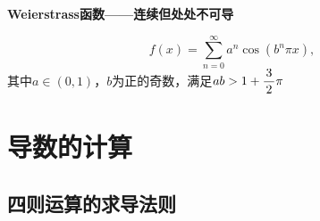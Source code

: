 \begin{shaded}
	{\bf Weierstrass函数——连续但处处不可导}
	
	$$f(x)=\sum\limits_{n=0}^{\infty}a^n\cos(b^n\pi x),$$
	其中$a\in(0,1)$，$b$为正的奇数，满足$ab>1+\displaystyle\frac{\,{3}\,}{\,{2}\,}\pi$
	
	\begin{center}
	\end{center}
\end{shaded}

\section{导数的计算}

\subsection{四则运算的求导法则}

